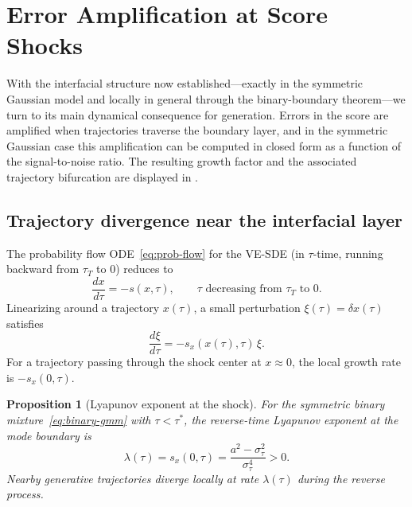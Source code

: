 \documentclass[11pt]{article}
\newtheorem{proposition}[theorem]{Proposition}
\begin{document}
\section{Error Amplification at Score Shocks}\label{sec:amplification}

With the interfacial structure now established---exactly in the symmetric Gaussian model and locally in general through the binary-boundary theorem---we turn to its main dynamical consequence for generation.
Errors in the score are amplified when trajectories traverse the boundary layer, and in the symmetric Gaussian case this amplification can be computed in closed form as a function of the signal-to-noise ratio.
The resulting growth factor and the associated trajectory bifurcation are displayed in .

\subsection{Trajectory divergence near the interfacial layer}\label{sec:amp:trajectory}

The probability flow ODE~\eqref{eq:prob-flow} for the VE-SDE (in $\tau$-time, running backward from $\tau_T$ to $0$) reduces to
\begin{equation}\label{eq:prob-flow-tau}
  \frac{dx}{d\tau} = -s(x,\tau), \qquad \tau \text{ decreasing from } \tau_T \text{ to } 0.
\end{equation}
Linearizing around a trajectory $x(\tau)$, a small perturbation $\xi(\tau) = \delta x(\tau)$ satisfies
\begin{equation}\label{eq:linearized-flow}
  \frac{d\xi}{d\tau} = -s_x(x(\tau),\tau)\,\xi.
\end{equation}
For a trajectory passing through the shock center at $x \approx 0$, the local growth rate is $-s_x(0,\tau)$.

\begin{proposition}[Lyapunov exponent at the shock]\label{prop:lyapunov}
For the symmetric binary mixture~\eqref{eq:binary-gmm} with $\tau < \tau^\ast$, the reverse-time Lyapunov exponent at the mode boundary is
\begin{equation}\label{eq:lyapunov}
  \lambda(\tau) = s_x(0,\tau) = \frac{a^2 - \sigma_\tau^2}{\sigma_\tau^4} > 0.
\end{equation}
Nearby generative trajectories diverge locally at rate $\lambda(\tau)$ during the reverse process.
\end{proposition}
\end{document}
